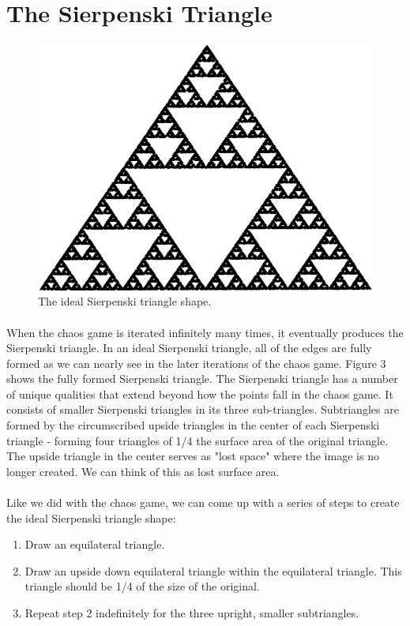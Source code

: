 \documentclass{article}
\begin{document}
\section*{The Sierpenski Triangle}
\begin{figure}[H]
    \centering
    \includegraphics[width=.5\linewidth, height=.25\textheight]{ideal}
    \caption{The ideal Sierpenski triangle shape.}
\end{figure}
\paragraph{}
When the chaos game is iterated infinitely many times, it eventually produces the Sierpenski triangle. In an ideal Sierpenski triangle, all of the edges are fully formed as we can nearly see in the later iterations of the chaos game. Figure 3 shows the fully formed Sierpenski triangle. The Sierpenski triangle has a number of unique qualities that extend beyond how the points fall in the chaos game. It consists of smaller Sierpenski triangles in its three sub-triangles. Subtriangles are formed by the circumscribed upside triangles in the center of each Sierpenski triangle - forming four triangles of 1/4 the surface area of the original triangle. The upside triangle in the center serves as "lost space" where the image is no longer created. We can think of this as lost surface area.
\paragraph{}
Like we did with the chaos game, we can come up with a series of steps to create the ideal Sierpenski triangle shape:
\begin{enumerate}
    \item Draw an equilateral triangle.
    \item Draw an upside down equilateral triangle within the equilateral triangle. This triangle should be 1/4 of the size of the original.
    \item Repeat step 2 indefinitely for the three upright, smaller subtriangles.
\end{enumerate}
\end{document}
